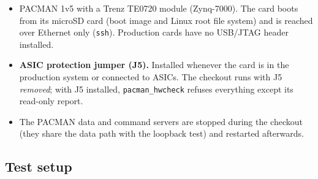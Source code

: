 \documentclass[11pt]{article}
\begin{document}
\begin{itemize}
\item PACMAN 1v5 with a Trenz TE0720 module (Zynq-7000).  The card boots from its microSD card (boot image and
  Linux root file system) and is reached over Ethernet only (\texttt{ssh}).  Production cards have no USB/JTAG
  header installed.
\item \textbf{ASIC protection jumper (J5).}  Installed whenever the card is in the production system or connected
  to ASICs.  The checkout runs with J5 \emph{removed}; with J5 installed, \texttt{pacman\_hwcheck} refuses
  everything except its read-only report.
\item The PACMAN data and command servers are stopped during the checkout (they share the data path with the
  loopback test) and restarted afterwards.
\end{itemize}


\subsection{Test setup}
\end{document}
